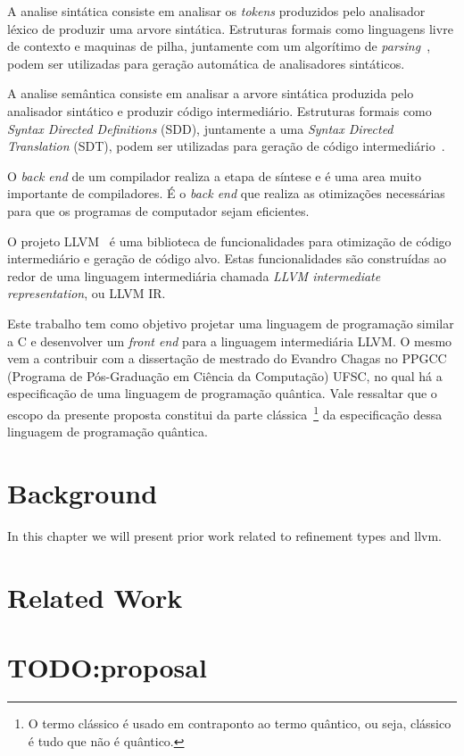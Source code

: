 \documentclass[
  english,
  lmodern,
  oneside
]{ufsc-thesis-rn46-2019/ufsc-thesis-rn46-2019}
\begin{document}
A analise sintática consiste em analisar os \textit{tokens} produzidos pelo analisador léxico de produzir uma arvore sintática.
Estruturas formais como linguagens livre de contexto e maquinas de pilha, juntamente com um algorítimo de \textit{parsing}~\cite{knuth1965translation}, podem ser utilizadas para geração automática de analisadores sintáticos.

A analise semântica consiste em analisar a arvore sintática produzida pelo analisador sintático e produzir código intermediário.
Estruturas formais como \textit{Syntax Directed Definitions} (SDD), juntamente a uma \textit{Syntax Directed Translation} (SDT), podem ser utilizadas para geração de código intermediário~\cite{Aho:2006:CPT:1177220}.

O \textit{back end} de um compilador realiza a etapa de síntese e é uma area muito importante de compiladores.
É o \textit{back end} que realiza as otimizações necessárias para que os programas de computador sejam eficientes.

O projeto LLVM~\cite{lattner2004llvm} é uma biblioteca de funcionalidades para otimização de código intermediário e geração de código alvo.
Estas funcionalidades são construídas ao redor de uma linguagem intermediária chamada \textit{LLVM intermediate representation}, ou LLVM IR\@.

Este trabalho tem como objetivo projetar uma linguagem de programação similar a C e desenvolver um \textit{front end} para a linguagem intermediária LLVM\@.
O mesmo vem a contribuir com a dissertação de mestrado do Evandro Chagas no PPGCC (Programa de Pós-Graduação em Ciência da Computação) UFSC, no qual há a especificação de uma linguagem de programação quântica.
Vale ressaltar que o escopo da presente proposta constitui da parte clássica~\footnote{O termo clássico é usado em contraponto ao termo quântico, ou seja, clássico é tudo que não é quântico.} da especificação dessa linguagem de programação quântica.

\chapter{Background}\label{cap:background}

In this chapter we will present prior work related to refinement types and llvm.

\chapter{Related Work}\label{cap:related_work}

\chapter{TODO:\@ proposal}

\postextual{}


\apendices{}
\end{document}
